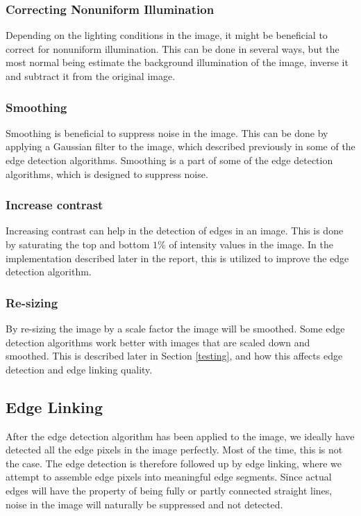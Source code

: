 \subsubsection{Correcting Nonuniform Illumination}
Depending on the lighting conditions in the image, it might be beneficial to correct for nonuniform illumination. This can be done in several ways, but the most normal being estimate the background illumination of the image, inverse it and subtract it from the original image.
\subsubsection{Smoothing}
Smoothing is beneficial to suppress noise in the image. This can be done by applying a Gaussian filter to the image, which described previously in some of the edge detection algorithms. Smoothing is a part of some of the edge detection algorithms, which is designed to suppress noise.
\subsubsection{Increase contrast}
Increasing contrast can help in the detection of edges in an image. This is done by saturating the top and bottom $1\%$ of intensity values in the image. In the implementation described later in the report, this is utilized to improve the edge detection algorithm.
\subsubsection{Re-sizing}
By re-sizing the image by a scale factor the image will be smoothed. Some edge detection algorithms work better with images that are scaled down and smoothed. This is described later in Section \ref{testing}, and how this affects edge detection and edge linking quality.

\newpage
\subsection{Edge Linking}
After the edge detection algorithm has been applied to the image, we ideally have detected all the edge pixels in the image perfectly. Most of the time, this is not the case. The edge detection is therefore followed up by edge linking, where we attempt to assemble edge pixels into meaningful edge segments. Since actual edges will have the property of being fully or partly connected straight lines, noise in the image will naturally be suppressed and not detected. 

